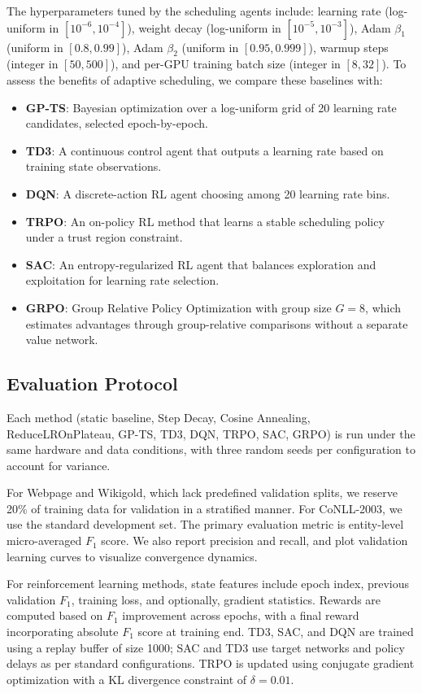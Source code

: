 \documentclass[11pt]{article}
\begin{document}
The hyperparameters tuned by the scheduling agents include: learning rate (log-uniform in $[10^{-6}, 10^{-4}]$), weight decay (log-uniform in $[10^{-5}, 10^{-3}]$), Adam $\beta_1$ (uniform in $[0.8, 0.99]$), Adam $\beta_2$ (uniform in $[0.95, 0.999]$), warmup steps (integer in $[50, 500]$), and per-GPU training batch size (integer in $[8, 32]$). To assess the benefits of adaptive scheduling, we compare these baselines with:

\begin{itemize}
    \item \textbf{GP-TS}: Bayesian optimization over a log-uniform grid of 20 learning rate candidates, selected epoch-by-epoch.
    \item \textbf{TD3}: A continuous control agent that outputs a learning rate based on training state observations.
    \item \textbf{DQN}: A discrete-action RL agent choosing among 20 learning rate bins.
    \item \textbf{TRPO}: An on-policy RL method that learns a stable scheduling policy under a trust region constraint.
    \item \textbf{SAC}: An entropy-regularized RL agent that balances exploration and exploitation for learning rate selection.
    \item \textbf{GRPO}: Group Relative Policy Optimization with group size $G=8$, which estimates advantages through group-relative comparisons without a separate value network.
\end{itemize}

\subsection{Evaluation Protocol}

Each method (static baseline, Step Decay, Cosine Annealing, ReduceLROnPlateau, GP-TS, TD3, DQN, TRPO, SAC, GRPO) is run under the same hardware and data conditions, with three random seeds per configuration to account for variance.

For Webpage and Wikigold, which lack predefined validation splits, we reserve 20\% of training data for validation in a stratified manner. For CoNLL-2003, we use the standard development set. The primary evaluation metric is entity-level micro-averaged $F_1$ score. We also report precision and recall, and plot validation learning curves to visualize convergence dynamics.

For reinforcement learning methods, state features include epoch index, previous validation $F_1$, training loss, and optionally, gradient statistics. Rewards are computed based on $F_1$ improvement across epochs, with a final reward incorporating absolute $F_1$ score at training end. TD3, SAC, and DQN are trained using a replay buffer of size 1000; SAC and TD3 use target networks and policy delays as per standard configurations. TRPO is updated using conjugate gradient optimization with a KL divergence constraint of $\delta=0.01$.
\end{document}
